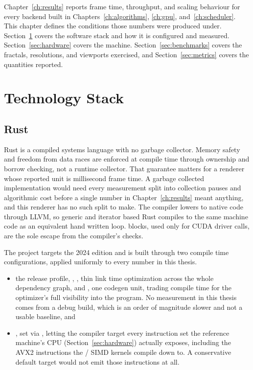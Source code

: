 \documentclass{ftndiplomski}
\begin{document}
Chapter~\ref{ch:results} reports frame time, throughput, and scaling
behaviour for every backend built in Chapters~\ref{ch:algorithms},
\ref{ch:gpu}, and~\ref{ch:scheduler}. This chapter defines the conditions
those numbers were produced under. Section~\ref{sec:technology-stack}
covers the software stack and how it is configured and measured.
Section~\ref{sec:hardware} covers the machine. Section~\ref{sec:benchmarks}
covers the fractals, resolutions, and viewports exercised, and
Section~\ref{sec:metrics} covers the quantities reported.

\section{Technology Stack}
\label{sec:technology-stack}

\subsection{Rust}
\label{sec:rust}

Rust is a compiled systems language with no garbage collector. Memory
safety and freedom from data races are enforced at compile time through
ownership and borrow checking, not a runtime collector. That guarantee
matters for a renderer whose reported unit is millisecond frame time. A
garbage collected implementation would need every measurement split into
collection pauses and algorithmic cost before a single number in
Chapter~\ref{ch:results} meant anything, and this renderer has no such
split to make. The compiler lowers to native code through LLVM, so generic
and iterator based Rust compiles to the same machine code as an equivalent
hand written loop.  blocks, used only for CUDA driver calls,
are the sole escape from the compiler's checks.

The project targets the 2024 edition and is built through two compile time
configurations, applied uniformly to every number in this thesis.
\begin{itemize}
  \item the release profile, , ,
  thin link time optimization across the whole dependency graph, and
  , one codegen unit, trading compile time for the
  optimizer's full visibility into the program. No measurement in this
  thesis comes from a debug build, which is an order of magnitude slower
  and not a usable baseline, and
  \item {}, set via , letting the
  compiler target every instruction set the reference machine's CPU
  (Section~\ref{sec:hardware}) actually exposes, including the AVX2
  instructions the / SIMD kernels compile down to.
  A conservative default target would not emit those instructions at all.
\end{itemize}
\end{document}
